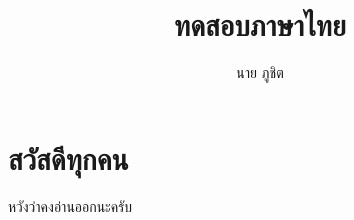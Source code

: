 \documentclass{article}
\title{ทดสอบภาษาไทย}
\author{นาย ภูชิต}
\begin{document}
\maketitle
\section{สวัสดีทุกคน}
หวังว่าคงอ่านออกนะครับ
\end{document}

